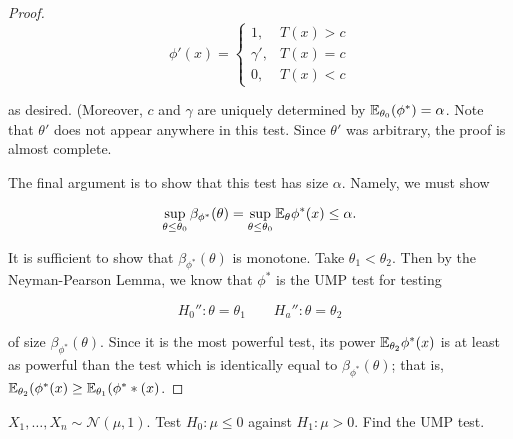 \begin{proof}
\[
\phi'(x) = \begin{cases}
1, & T(x) > c \\
\gamma', & T(x) = c \\
0, & T(x) < c
\end{cases}
\]

as desired. (Moreover, \(c\) and \(\gamma\) are uniquely determined by \(\E_{\theta_0}(\phi^*) = \alpha\). Note that \(\theta'\) does not appear anywhere in this test. Since \(\theta'\) was arbitrary, the proof is almost complete.

The final argument is to show that this test has size \(\alpha\). Namely, we must show

\[
\sup_{\theta \leq \theta_0} \beta_{\phi^*}(\theta) = \sup_{\theta \leq \theta_0} \E_\theta \phi^*(x) \leq \alpha.
\]

It is sufficient to show that \(\beta_{\phi^*}(\theta)\) is monotone. Take \(\theta_1 < \theta_2\). Then by the Neyman-Pearson Lemma, we know that \(\phi^*\) is the UMP test for testing

\[
H_0'':  \theta = \theta_1 \qquad H_a'':  \theta = \theta_2
\]

of size \(\beta_{\phi^*}(\theta)\). Since it is the most powerful test, its power \(\E_{\theta_2} \phi^*(x)\) is at least as powerful than the test which is identically equal to \(\beta_{\phi^*}(\theta)\); that is, \(\E_{\theta_2}(\phi^*(x) \geq \E_{\theta_1}(\phi^**(x)\).



\end{proof}


\begin{example}

\(X_1, \ldots, X_n \sim \mathcal{N}(\mu, 1)\). Test \(H_0: \mu \leq 0\) against \(H_1: \mu > 0\). Find the UMP test.

\end{example}

